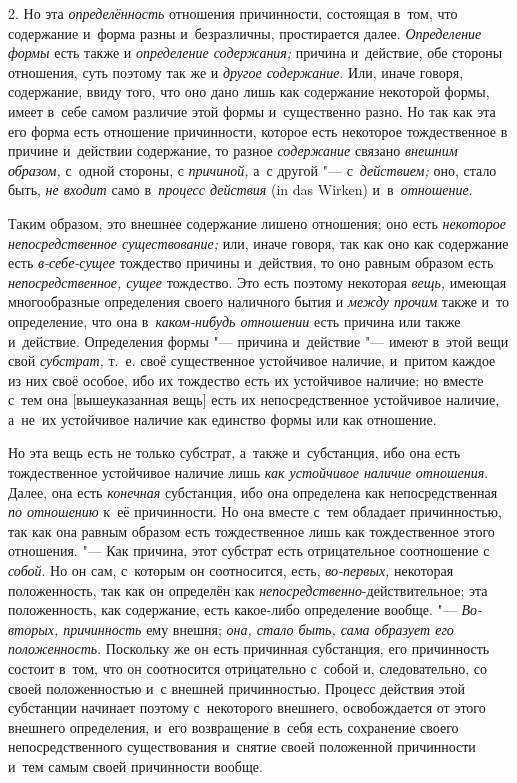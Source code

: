 2. Но эта {\em определённость} отношения причинности, состоящая в~том, что
содержание и~форма разны и~безразличны, простирается далее. {\em Определение
формы} есть также и {\em определение содержания;} причина и~действие, обе
стороны отношения, суть поэтому так же и {\em другое содержание}. Или, иначе
говоря, содержание, ввиду того, что оно дано лишь как содержание некоторой
формы, имеет в~себе самом различие этой формы и~существенно разно. Но так как
эта его форма есть отношение причинности, которое есть некоторое тождественное
в причине и~действии содержание, то разное {\em содержание} связано
{\em внешним образом,} с~одной стороны, с {\em причиной,} а~с другой "---
с~{\em действием;} оно, стало быть, {\em не входит} само
в~{\em процесс действия} (in das Wir\-ken) и~в~{\em отношение}.

Таким образом, это внешнее содержание лишено отношения; оно есть
{\em некоторое непосредственное существование;} или, иначе говоря, так как оно
как содержание есть {\em в-себе-сущее} тождество причины и~действия, то оно
равным образом есть {\em непосредственное, сущее} тождество. Это есть поэтому
некоторая {\em вещь,} имеющая многообразные определения своего наличного бытия
и {\em между прочим} также и~то определение, что она
в~{\em каком-нибудь отношении} есть причина или также и~действие. Определения
формы "--- причина и~действие "--- имеют в~этой вещи свой {\em субстрат,} т.~е.
своё существенное устойчивое наличие, и~притом каждое из них своё особое, ибо
их тождество есть их устойчивое наличие; но вместе с~тем она
[вышеуказанная вещь] есть их непосредственное устойчивое наличие,
а~не~их устойчивое наличие как единство формы или как отношение.

Но эта вещь есть не только субстрат, а~также и~субстанция, ибо она есть
тождественное устойчивое наличие лишь {\em как устойчивое наличие отношения}.
Далее, она есть {\em конечная} субстанция, ибо она определена как
непосредственная {\em по отношению} к~её причинности. Но она вместе с~тем
обладает причинностью, так как она равным образом есть тождественное лишь как
тождественное этого отношения. "--- Как причина, этот субстрат есть
отрицательное соотношение с {\em собой}. Но он сам, с~которым он соотносится,
есть, {\em во-первых,} некоторая положенность, так как он определён как
{\em непосредственно}-действительное; эта положенность, как содержание, есть
какое-либо определение вообще. "--- {\em Во-вторых, причинность} ему
внешня; {\em она, стало быть, сама образует его положенность}. Поскольку же он
есть причинная субстанция, его причинность состоит в~том, что он соотносится
отрицательно с~собой и, следовательно, со своей положенностью и~с внешней
причинностью. Процесс действия этой субстанции начинает поэтому с~некоторого
внешнего, освобождается от этого внешнего определения, и~его возвращение в~себя
есть сохранение своего непосредственного существования и~снятие своей
положенной причинности и~тем самым своей причинности вообще.

